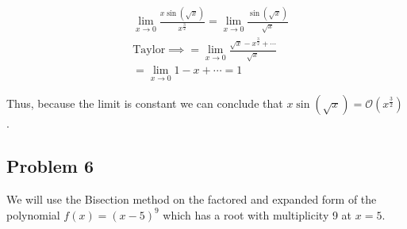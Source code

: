 \documentclass[11pt]{article}
\begin{document}
\begin{align}
    &\lim_{x\to0}\frac{x\sin(\sqrt{x})}{x^{\frac{3}{2}}} = \lim_{x\to0}\frac{\sin(\sqrt{x})}{\sqrt{x}}\\
    &\text{Taylor}\implies = \lim_{x\to0}\frac{\sqrt{x}-x^{\frac{3}{2}} + \cdots}{\sqrt{x}}\\
    &=\lim_{x\to0} 1 - x + \cdots = 1
\end{align}

Thus, because the limit is constant we can conclude that
\(x\sin(\sqrt{x})=\mathcal{O}(x^{\frac{3}{2}})\).

\newpage

    \hypertarget{problem-6}{%
\subsection*{Problem 6}\label{problem-6}}

We will use the Bisection method on the factored and expanded form of
the polynomial \(f(x)=(x-5)^9\) which has a root with multiplicity 9 at
\(x=5\).
\end{document}
